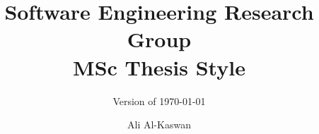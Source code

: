 \documentclass[twoside,a4paper,12pt]{memoir}
\title{Software Engineering Research Group \\MSc Thesis Style}
\subtitle{Version of \today}
\author{Ali Al-Kaswan}                               %
\begin{document}
\frontmatter
\thispagestyle{empty}
\maketitle                                      %



\cleardoublepage\tableofcontents
\cleardoublepage\listoffigures
\cleardoublepage\mainmatter













\appendix
\def\chaptername{Appendix}

% 
\end{document}
